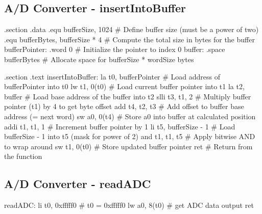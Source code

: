 \subsection{A/D Converter - insertIntoBuffer}
\begin{assembly}
.section .data
    .equ bufferSize, 1024              # Define buffer size (must be a power of two)
    .equ bufferBytes, bufferSize * 4  # Compute the total size in bytes for the buffer
    bufferPointer:
        .word 0                       # Initialize the pointer to index 0
    buffer:
        .space bufferBytes            # Allocate space for bufferSize * wordSize bytes

.section .text
insertIntoBuffer:
    la    t0, bufferPointer           # Load address of bufferPointer into t0
    lw    t1, 0(t0)                   # Load current buffer pointer into t1
    la    t2, buffer                  # Load base address of the buffer into t2
    slli  t3, t1, 2                   # Multiply buffer pointer (t1) by 4 to get byte offset
    add   t4, t2, t3                  # Add offset to buffer base address (= next word)
    sw    a0, 0(t4)                   # Store a0 into buffer at calculated position
    addi  t1, t1, 1                   # Increment buffer pointer by 1
    li    t5, bufferSize - 1          # Load bufferSize - 1 into t5 (mask for power of 2)
    and   t1, t1, t5                  # Apply bitwise AND to wrap around
    sw    t1, 0(t0)                   # Store updated buffer pointer
    ret                               # Return from the function
\end{assembly}
    \newpage
\subsection{A/D Converter - readADC}
\begin{assembly}
readADC:
    li t0, 0xfffff0 # t0 = 0xfffff0
    lw a0, 8(t0) # get ADC data output
    ret
\end{assembly}
